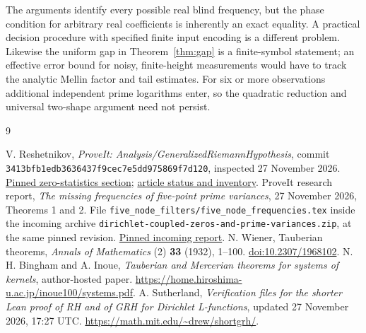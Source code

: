 \documentclass[11pt]{article}
\theoremstyle{definition}\newtheorem{definition}[theorem]{Definition}
\theoremstyle{remark}\newtheorem{remark}[theorem]{Remark}
\begin{document}
The arguments identify every possible real blind frequency, but the phase
condition for arbitrary real coefficients is inherently an exact equality.
A practical decision procedure with specified finite input encoding is a
different problem. Likewise the uniform gap in Theorem~\ref{thm:gap} is a
finite-symbol statement; an effective error bound for noisy, finite-height
measurements would have to track the analytic Mellin factor and tail estimates.
For six or more observations additional independent prime logarithms enter,
so the quadratic reduction and universal two-shape argument need not persist.

\begin{thebibliography}{9}
\raggedright
{}
V. Reshetnikov, \emph{ProveIt: Analysis/GeneralizedRiemannHypothesis},
commit \texttt{3413bfb1edb3636437f9cec7e5dd975869f7d120}, inspected 27 November 2026.
\href{https://github.com/VladimirReshetnikov/ProveIt/blob/3413bfb1edb3636437f9cec7e5dd975869f7d120/Analysis/GeneralizedRiemannHypothesis/Article/sections/zer.tex}{Pinned zero-statistics section};
\href{https://github.com/VladimirReshetnikov/ProveIt/blob/3413bfb1edb3636437f9cec7e5dd975869f7d120/Analysis/GeneralizedRiemannHypothesis/Article/README.md}{article status and inventory}.
ProveIt research report, \emph{The missing frequencies of five-point prime variances},
27 November 2026, Theorems 1 and 2. File \texttt{five\_node\_filters/five\_node\_frequencies.tex}
inside the incoming archive \texttt{dirichlet-coupled-zeros-and-prime-variances.zip},
at the same pinned revision.
\href{https://github.com/VladimirReshetnikov/ProveIt/blob/3413bfb1edb3636437f9cec7e5dd975869f7d120/Analysis/GeneralizedRiemannHypothesis/docs/incoming/dirichlet-coupled-zeros-and-prime-variances.zip}{Pinned incoming report}.
N. Wiener, Tauberian theorems, \emph{Annals of Mathematics} (2) \textbf{33}
(1932), 1--100. \href{https://doi.org/10.2307/1968102}{doi:10.2307/1968102}.
N. H. Bingham and A. Inoue, \emph{Tauberian and Mercerian theorems for systems of kernels},
author-hosted paper. \url{https://home.hiroshima-u.ac.jp/inoue100/systems.pdf}.
A. Sutherland, \emph{Verification files for the shorter Lean proof of RH and of GRH
for Dirichlet L-functions}, updated 27 November 2026, 17:27 UTC.
\url{https://math.mit.edu/~drew/shortgrh/}.
\end{thebibliography}
\end{document}
